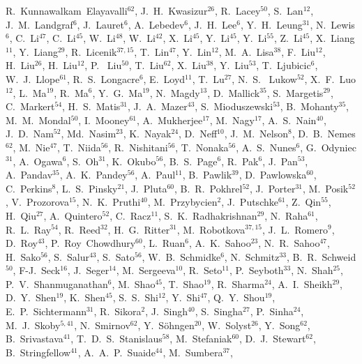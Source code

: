 {R.~Kunnawalkam~Elayavalli$^{62}$,
J.~H.~Kwasizur$^{26}$,
R.~Lacey$^{50}$,
S.~Lan$^{12}$,
J.~M.~Landgraf$^{6}$,
J.~Lauret$^{6}$,
A.~Lebedev$^{6}$,
J.~H.~Lee$^{6}$,
Y.~H.~Leung$^{31}$,
N.~Lewis$^{6}$,
C.~Li$^{47}$,
C.~Li$^{45}$,
W.~Li$^{48}$,
W.~Li$^{42}$,
X.~Li$^{45}$,
Y.~Li$^{45}$,
Y.~Li$^{55}$,
Z.~Li$^{45}$,
X.~Liang$^{11}$,
Y.~Liang$^{29}$,
R.~Licenik$^{37,15}$,
T.~Lin$^{47}$,
Y.~Lin$^{12}$,
M.~A.~Lisa$^{38}$,
F.~Liu$^{12}$,
H.~Liu$^{26}$,
H.~Liu$^{12}$,
P.~ Liu$^{50}$,
T.~Liu$^{62}$,
X.~Liu$^{38}$,
Y.~Liu$^{53}$,
T.~Ljubicic$^{6}$,
W.~J.~Llope$^{61}$,
R.~S.~Longacre$^{6}$,
E.~Loyd$^{11}$,
T.~Lu$^{27}$,
N.~S.~ Lukow$^{52}$,
X.~F.~Luo$^{12}$,
L.~Ma$^{19}$,
R.~Ma$^{6}$,
Y.~G.~Ma$^{19}$,
N.~Magdy$^{13}$,
D.~Mallick$^{35}$,
S.~Margetis$^{29}$,
C.~Markert$^{54}$,
H.~S.~Matis$^{31}$,
J.~A.~Mazer$^{43}$,
S.~Mioduszewski$^{53}$,
B.~Mohanty$^{35}$,
M.~M.~Mondal$^{50}$,
I.~Mooney$^{61}$,
A.~Mukherjee$^{17}$,
M.~Nagy$^{17}$,
A.~S.~Nain$^{40}$,
J.~D.~Nam$^{52}$,
Md.~Nasim$^{23}$,
K.~Nayak$^{24}$,
D.~Neff$^{10}$,
J.~M.~Nelson$^{8}$,
D.~B.~Nemes$^{62}$,
M.~Nie$^{47}$,
T.~Niida$^{56}$,
R.~Nishitani$^{56}$,
T.~Nonaka$^{56}$,
A.~S.~Nunes$^{6}$,
G.~Odyniec$^{31}$,
A.~Ogawa$^{6}$,
S.~Oh$^{31}$,
K.~Okubo$^{56}$,
B.~S.~Page$^{6}$,
R.~Pak$^{6}$,
J.~Pan$^{53}$,
A.~Pandav$^{35}$,
A.~K.~Pandey$^{56}$,
A.~Paul$^{11}$,
B.~Pawlik$^{39}$,
D.~Pawlowska$^{60}$,
C.~Perkins$^{8}$,
L.~S.~Pinsky$^{21}$,
J.~Pluta$^{60}$,
B.~R.~Pokhrel$^{52}$,
J.~Porter$^{31}$,
M.~Posik$^{52}$,
V.~Prozorova$^{15}$,
N.~K.~Pruthi$^{40}$,
M.~Przybycien$^{2}$,
J.~Putschke$^{61}$,
Z.~Qin$^{55}$,
H.~Qiu$^{27}$,
A.~Quintero$^{52}$,
C.~Racz$^{11}$,
S.~K.~Radhakrishnan$^{29}$,
N.~Raha$^{61}$,
R.~L.~Ray$^{54}$,
R.~Reed$^{32}$,
H.~G.~Ritter$^{31}$,
M.~Robotkova$^{37,15}$,
J.~L.~Romero$^{9}$,
D.~Roy$^{43}$,
P.~Roy~Chowdhury$^{60}$,
L.~Ruan$^{6}$,
A.~K.~Sahoo$^{23}$,
N.~R.~Sahoo$^{47}$,
H.~Sako$^{56}$,
S.~Salur$^{43}$,
S.~Sato$^{56}$,
W.~B.~Schmidke$^{6}$,
N.~Schmitz$^{33}$,
B.~R.~Schweid$^{50}$,
F-J.~Seck$^{16}$,
J.~Seger$^{14}$,
M.~Sergeeva$^{10}$,
R.~Seto$^{11}$,
P.~Seyboth$^{33}$,
N.~Shah$^{25}$,
P.~V.~Shanmuganathan$^{6}$,
M.~Shao$^{45}$,
T.~Shao$^{19}$,
R.~Sharma$^{24}$,
A.~I.~Sheikh$^{29}$,
D.~Y.~Shen$^{19}$,
K.~Shen$^{45}$,
S.~S.~Shi$^{12}$,
Y.~Shi$^{47}$,
Q.~Y.~Shou$^{19}$,
E.~P.~Sichtermann$^{31}$,
R.~Sikora$^{2}$,
J.~Singh$^{40}$,
S.~Singha$^{27}$,
P.~Sinha$^{24}$,
M.~J.~Skoby$^{5,41}$,
N.~Smirnov$^{62}$,
Y.~S\"{o}hngen$^{20}$,
W.~Solyst$^{26}$,
Y.~Song$^{62}$,
B.~Srivastava$^{41}$,
T.~D.~S.~Stanislaus$^{58}$,
M.~Stefaniak$^{60}$,
D.~J.~Stewart$^{62}$,
B.~Stringfellow$^{41}$,
A.~A.~P.~Suaide$^{44}$,
M.~Sumbera$^{37}$,
}
